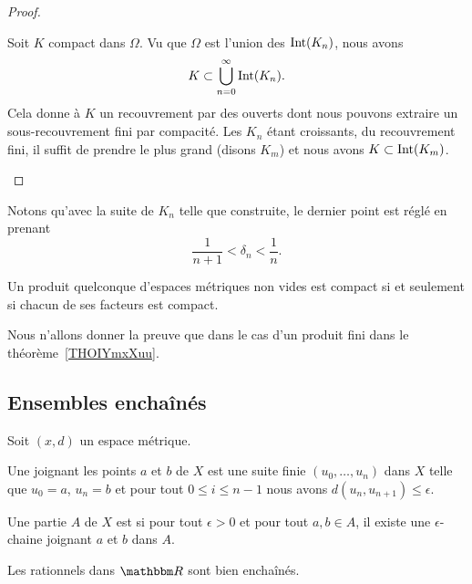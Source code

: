 \begin{proof}
\begin{enumerate}
            Soit \( K\) compact dans \( \Omega\). Vu que \( \Omega\) est l'union des \( \operatorname{Int}(K_n)\), nous avons
            \begin{equation}
                K\subset\bigcup_{n=0}^{\infty}\operatorname{Int}(K_n).
            \end{equation}
            Cela donne à \( K\) un recouvrement par des ouverts dont nous pouvons extraire un sous-recouvrement fini par compacité. Les \( K_n\) étant croissants, du recouvrement fini, il suffit de prendre le plus grand (disons \( K_m\)) et nous avons \( K\subset\operatorname{Int}(K_m)\).

    \end{enumerate}
\end{proof}
Notons qu'avec la suite de \( K_n\) telle que construite, le dernier point est réglé en prenant
\begin{equation}
    \frac{1}{ n+1 }<\delta_n<\frac{1}{ n }.
\end{equation}


\begin{theorem}[Tykhonov]\label{ThoFWXsQOZ}
    Un produit quelconque d'espaces métriques non vides est compact si et seulement si chacun de ses facteurs est compact.
\end{theorem}
Nous n'allons donner la preuve que dans le cas d'un produit fini dans le théorème~\ref{THOIYmxXuu}.

\subsection{Ensembles enchaînés}

Soit \( (x,d)\) un espace métrique.
\begin{definition}
    Une  joignant les points \( a\) et \( b\) de \( X\) est une suite finie \( (u_0,\ldots, u_n)\) dans \( X\) telle que \( u_0=a\), \( u_n=b\) et pour tout \( 0\leq i\leq n-1\) nous avons \( d(u_n,u_{n+1})\leq \epsilon\).

    Une partie \( A\) de \( X\) est  si pour tout \( \epsilon>0\) et pour tout \( a,b\in A\), il existe une \( \epsilon\)-chaine joignant \( a\) et \( b\) dans $A$.
\end{definition}
Les rationnels dans \( \eR\) sont bien enchaînés.

